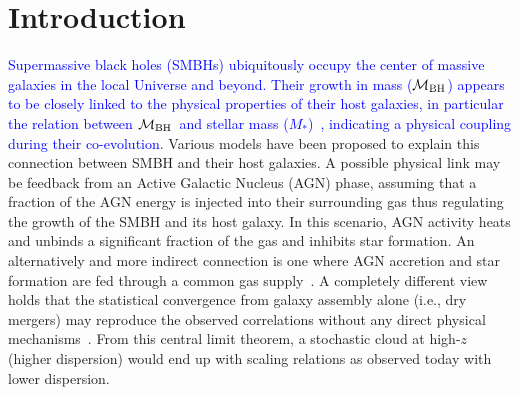 \documentclass[twocolumn,trackchanges]{aastex63}
\newcommand{\mbh}{$\mathcal M_{\rm BH}$}
\newcommand{\mstar}{{$M_*$}}
\newcommand{\blue}[1]{{ \textcolor{blue}{#1}}}
\begin{document}

\section{Introduction} \label{sec:intro}
\blue{Supermassive black holes (SMBHs) ubiquitously occupy the center of massive galaxies in the local Universe and beyond. Their growth in mass (\mbh) appears to be closely linked to the physical properties of their host galaxies, in particular the relation between \mbh ~and stellar mass (\mstar)~\citep{Mag++98, F+M00, M+H03, H+R04, Gul++09}, indicating a physical coupling during their co-evolution.}
Various models have been proposed to explain this connection between SMBH and their host galaxies. A possible physical link may be feedback from an Active Galactic Nucleus (AGN) phase, assuming that a fraction of the AGN energy is injected into their surrounding gas thus regulating the growth of the SMBH and its host galaxy. In this scenario, AGN activity heats and unbinds a significant fraction of the gas and inhibits star formation. An alternatively and more indirect connection is one where AGN accretion and star formation are fed through a common gas supply~\citep{Cen2015, Menci2016}. A completely different view holds that the statistical convergence from galaxy assembly alone (i.e., dry mergers) may reproduce the observed correlations without any direct physical mechanisms~\citep{Peng2007, Jahnke2011, Hirschmann2010}. From this central limit theorem, a stochastic cloud at high-$z$ (higher dispersion) would end up with scaling relations as observed today with lower dispersion.
\end{document}
